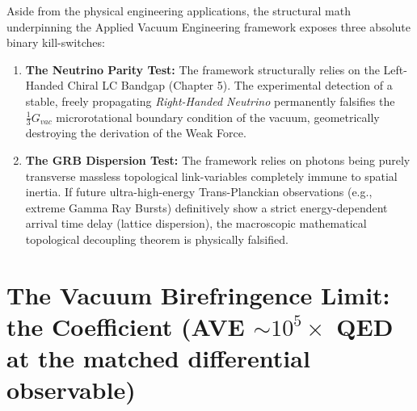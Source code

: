 Aside from the physical engineering applications, the structural math underpinning the Applied Vacuum Engineering framework exposes three absolute binary kill-switches:

\begin{enumerate}
    \item \textbf{The Neutrino Parity Test:} The framework structurally relies on the Left-Handed Chiral LC Bandgap (Chapter 5). The experimental detection of a stable, freely propagating \textit{Right-Handed Neutrino} permanently falsifies the $\frac{1}{3} G_{vac}$ microrotational boundary condition of the vacuum, geometrically destroying the derivation of the Weak Force.
    \item \textbf{The GRB Dispersion Test:} The framework relies on photons being purely transverse massless topological link-variables completely immune to spatial inertia. If future ultra-high-energy Trans-Planckian observations (e.g., extreme Gamma Ray Bursts) definitively show a strict energy-dependent arrival time delay (lattice dispersion), the macroscopic mathematical topological decoupling theorem is physically falsified.
\end{enumerate}

\section{The Vacuum Birefringence Limit: the Coefficient (AVE $\sim 10^5\times$ QED at the matched differential observable)}
\label{sec:vacuum_birefringence}


